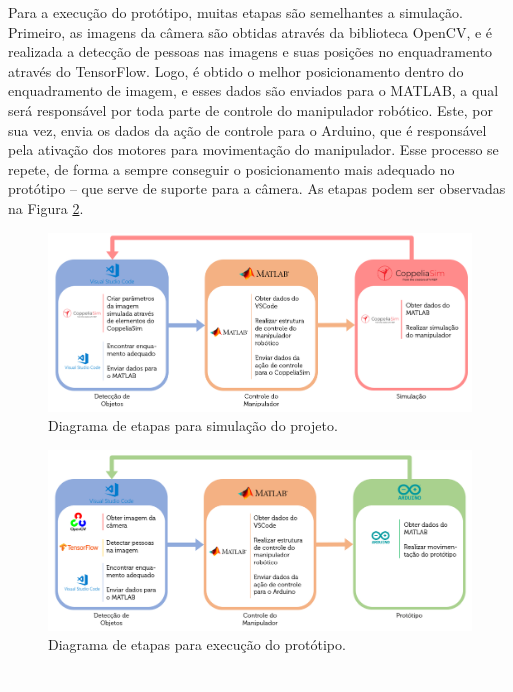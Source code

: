 
Para a execução do protótipo, muitas etapas são semelhantes a simulação. Primeiro, as imagens da câmera são obtidas através da biblioteca OpenCV, e é realizada a detecção de pessoas nas imagens e suas posições no enquadramento através do TensorFlow. Logo, é obtido o melhor posicionamento dentro do enquadramento de imagem, e esses dados são enviados para o MATLAB, a qual será responsável por toda parte de controle do manipulador robótico. Este, por sua vez, envia os dados da ação de controle para o Arduino, que é responsável pela ativação dos motores para movimentação do manipulador. Esse processo se repete, de forma a sempre conseguir o posicionamento mais adequado no protótipo – que serve de suporte para a câmera. As etapas podem ser observadas na Figura \ref{fig:DiagramaPrototipo}.

\begin{figure}[h!]
\centering
\includegraphics[width=0.9\columnwidth]{Imagens/DiagramaSimulacao.PNG}
\caption{Diagrama de etapas para simulação do projeto.}
\label{fig:DiagramaSimulacao}
\end{figure}

\begin{figure}[h!]
\centering
\includegraphics[width=0.9\columnwidth]{Imagens/DiagramaPrototipo.PNG}
\caption{Diagrama de etapas para execução do protótipo.}
\label{fig:DiagramaPrototipo}
\end{figure}



\textcolor{white}{.}

